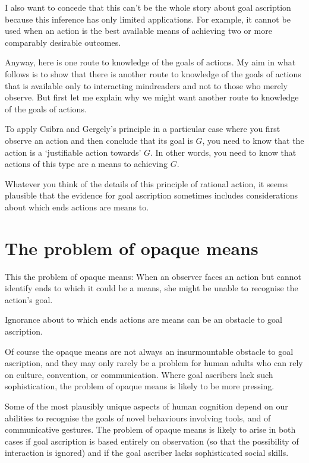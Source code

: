 \documentclass[12pt,\papersize]{extarticle}
\begin{document}
I also want to concede that this can't be the whole story about goal ascription  
because this inference has only limited applications.
For example, it cannot be used when an action is the best available means of achieving two or more comparably desirable outcomes. 


Anyway, here is one route to knowledge of the goals of actions.
My aim in what follows is to show that there is another route 
to knowledge of the goals of actions 
that is available only to interacting mindreaders
and not to those who merely observe.
But first let me explain why we might want another route to knowledge of the goals of actions.



To apply Csibra and Gergely's principle in a particular case where you first observe an action and then conclude that its goal is $G$,
you need to know that the action is a `justifiable action towards' $G$.
In other words, you need to know that actions of this type are a means to achieving $G$.

Whatever you think of the details of this principle of rational action, 
it seems plausible that the evidence for goal ascription sometimes includes considerations about which ends actions are means to.

\section{The problem of opaque means}
\label{sec:opaque_means}
This the problem of opaque means:
When an observer faces an action but cannot identify ends to which it could be a means, she might be unable to recognise the action's goal.

Ignorance about to which ends actions are means can be an obstacle to goal ascription.

Of course the opaque means are not always  an insurmountable obstacle to goal ascription, and
they may only rarely be a problem for human adults who can rely on culture, convention, or communication.
Where goal ascribers lack such sophistication, the problem of opaque means is likely to be more pressing.

Some of the most plausibly unique aspects of human cognition depend on our abilities to recognise the goals of novel behaviours involving tools, and of communicative gestures.
The problem of opaque means is likely to arise in both cases
if goal ascription is based  entirely on observation 
(so that the possibility of interaction is ignored)
and if the goal ascriber lacks sophisticated social skills.
\end{document}

